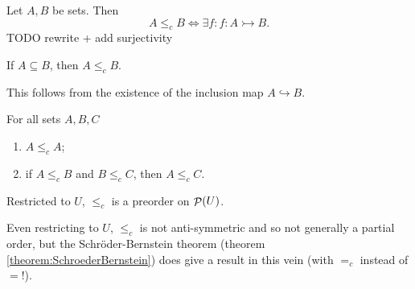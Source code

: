 \begin{proposition} \label{lemma:injectivityCardinality}
Let $A,B$ be sets. Then
\[ A\leq_c B \iff \exists f: f:A\rightarrowtail B. \]
TODO rewrite + add surjectivity
\end{proposition}
\begin{corollary}
If $A\subseteq B$, then $A\leq_c B$.
\end{corollary}
This follows from the existence of the inclusion map $A \hookrightarrow B$.

\begin{proposition}
For all sets $A,B,C$
\begin{enumerate}
\item $A\leq_c A$;
\item if $A\leq_c B$ and $B\leq_c C$, then $A\leq_c C$.
\end{enumerate}
Restricted to $U$, $\leq_c$ is a preorder on $\mathop{\mathcal{P}}(U)$.
\end{proposition}
Even restricting to $U$, $\leq_c$ is not anti-symmetric and so not generally a partial order, but the Schröder-Bernstein theorem (theorem \ref{theorem:SchroederBernstein}) does give a result in this vein (with $=_c$ instead of $=$!).

